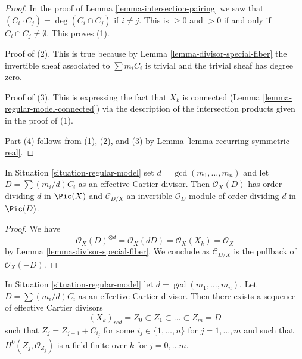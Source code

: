 \begin{proof}
In the proof of Lemma \ref{lemma-intersection-pairing} we saw that
$(C_i \cdot C_j) = \deg(C_i \cap C_j)$ if $i \not = j$. This is
$\geq 0$ and $> 0 $ if and only if $C_i \cap C_j \not = \emptyset$.
This proves (1).

\medskip\noindent
Proof of (2). This is true because by Lemma \ref{lemma-divisor-special-fiber}
the invertible sheaf associated to $\sum m_i C_i$
is trivial and the trivial sheaf has degree zero.

\medskip\noindent
Proof of (3). This is expressing the fact that $X_k$ is connected
(Lemma \ref{lemma-regular-model-connected})
via the description of the intersection products given in the proof of (1).

\medskip\noindent
Part (4) follows from (1), (2), and (3) by
Lemma \ref{lemma-recurring-symmetric-real}.
\end{proof}

\begin{lemma}
\label{lemma-multiple-fibre-normal-bundle}
In Situation \ref{situation-regular-model} set $d = \gcd(m_1, \ldots, m_n)$
and let $D = \sum (m_i/d)C_i$ as an effective Cartier divisor.
Then $\mathcal{O}_X(D)$ has order dividing $d$ in $\Pic(X)$
and $\mathcal{C}_{D/X}$ an invertible $\mathcal{O}_D$-module
of order dividing $d$ in $\Pic(D)$.
\end{lemma}

\begin{proof}
We have
$$
\mathcal{O}_X(D)^{\otimes d} = \mathcal{O}_X(dD) =
\mathcal{O}_X(X_k) = \mathcal{O}_X
$$
by Lemma \ref{lemma-divisor-special-fiber}.
We conclude as $\mathcal{C}_{D/X}$ is the pullback of
$\mathcal{O}_X(-D)$.
\end{proof}

\begin{lemma}
\label{lemma-regular-model-field}
\begin{reference}
\cite[Lemma 2.6]{Artin-Winters}
\end{reference}
In Situation \ref{situation-regular-model} let $d = \gcd(m_1, \ldots, m_n)$.
Let $D = \sum (m_i/d) C_i$ as an effective Cartier divisor. Then there exists
a sequence of effective Cartier divisors
$$
(X_k)_{red} = Z_0 \subset Z_1 \subset \ldots \subset Z_m = D
$$
such that $Z_j = Z_{j - 1} + C_{i_j}$ for some $i_j \in \{1, \ldots, n\}$
for $j = 1, \ldots, m$ and such that $H^0(Z_j, \mathcal{O}_{Z_j})$
is a field finite over $k$ for $j = 0, \ldots m$.
\end{lemma}

